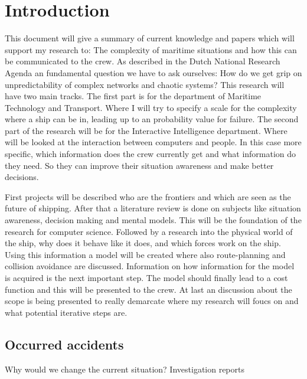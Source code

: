 \section*{Introduction}
\label{sec:introduction}

\noindent This document will give a summary of current knowledge and papers which will support my research to: The complexity of maritime situations and how this can be communicated to the crew.
As described in the Dutch National Research Agenda an fundamental question we have to ask ourselves: How do we get grip on unpredictability of complex networks and chaotic systems?  %
This research will have two main tracks. The first part is for the department of Maritime Technology and Transport. Where I will try to specify a scale for the complexity where a ship can be in, leading up to an probability value for failure. The second part of the research will be for the Interactive Intelligence department. Where will be looked at the interaction between computers and people. In this case more specific, which information does the crew currently get and what information do they need. So they can improve their situation awareness and make better decisions.

First projects will be described who are the frontiers and which are seen as the future of shipping.
After that a literature review is done on subjects like situation awareness, decision making and mental models. This will be the foundation of the research for computer science. 
Followed by a research into the physical world of the ship, why does it behave like it does, and which forces work on the ship. Using this information a model will be created where also route-planning and collision avoidance are discussed. 
Information on how information for the model is acquired is the next important step. The model should finally lead to a cost function and this will be presented to the crew. 
At last an discussion about the scope is being presented to really demarcate where my research will foucs on and what potential iterative steps are. 

\subsection*{Occurred accidents}
Why would we change the current situation?
Investigation reports